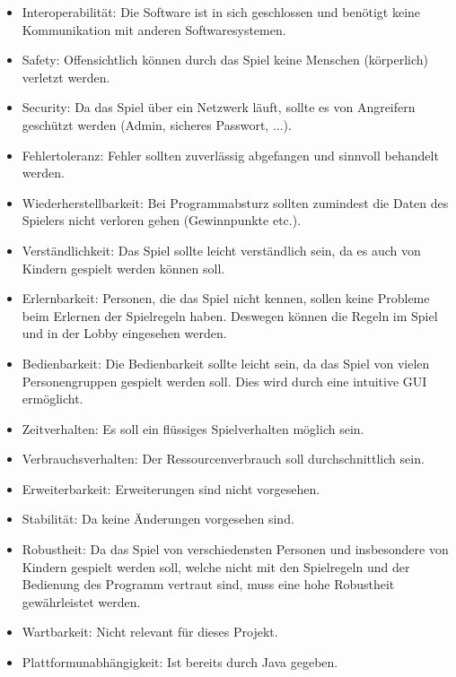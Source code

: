 \begin{itemize}
		\item Interoperabilität: Die Software ist in sich geschlossen und benötigt keine Kommunikation mit anderen Softwaresystemen.
		\item Safety: Offensichtlich können durch das Spiel keine Menschen (körperlich) verletzt werden.
		\item Security: Da das Spiel über ein Netzwerk läuft, sollte es von Angreifern geschützt werden (Admin, sicheres Passwort, ...).
		\item Fehlertoleranz: Fehler sollten zuverlässig abgefangen und sinnvoll behandelt werden.
		\item Wiederherstellbarkeit: Bei Programmabsturz sollten zumindest die Daten des Spielers nicht verloren gehen (Gewinnpunkte etc.).
		\item Verständlichkeit: Das Spiel sollte leicht verständlich sein, da es auch von Kindern gespielt werden können soll.
		\item Erlernbarkeit: Personen, die das Spiel nicht kennen, sollen keine Probleme beim Erlernen der Spielregeln haben.
		Deswegen können die Regeln im Spiel und in der Lobby eingesehen werden. 
		\item Bedienbarkeit: Die Bedienbarkeit sollte leicht sein, da das Spiel von vielen Personengruppen gespielt werden soll. Dies wird durch eine intuitive GUI ermöglicht.
		\item Zeitverhalten: Es soll ein flüssiges Spielverhalten möglich sein.
		\item Verbrauchsverhalten: Der Ressourcenverbrauch soll durchschnittlich sein.
		\item Erweiterbarkeit: Erweiterungen sind nicht vorgesehen.
		\item Stabilität: Da keine Änderungen vorgesehen sind.
		\item Robustheit: Da das Spiel von verschiedensten Personen und insbesondere von Kindern gespielt werden soll, welche nicht mit den Spielregeln und der Bedienung des Programm vertraut sind, muss eine hohe Robustheit gewährleistet werden.
		\item Wartbarkeit: Nicht relevant für dieses Projekt.
		\item Plattformunabhängigkeit: Ist bereits durch Java gegeben.
\end{itemize}